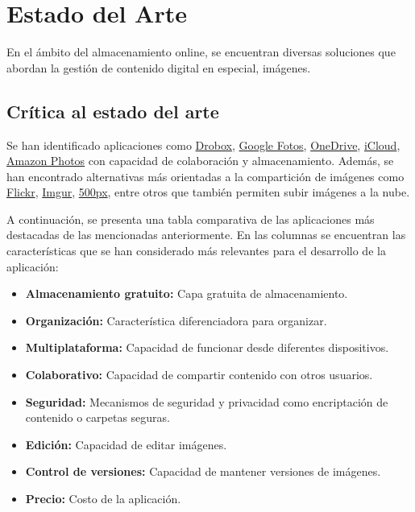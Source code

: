 \chapter{Estado del Arte}

En el ámbito del almacenamiento online, se encuentran diversas soluciones
que abordan la gestión de contenido digital en especial, imágenes.

\section{Crítica al estado del arte}

Se han identificado aplicaciones como \href{https://www.dropbox.com/es_ES/}{Drobox}, \href{https://www.google.com/intl/es/photos/about/}{Google Fotos}, \href{https://www.microsoft.com/es-es/microsoft-365/onedrive/online-cloud-storage}{OneDrive}, \href{https://www.icloud.com/}{iCloud}, \href{https://www.amazon.es/b?ie=UTF8&node=12364776031}{Amazon Photos} con capacidad de colaboración y almacenamiento.
Además, se han encontrado alternativas más orientadas a la compartición de imágenes como \href{https://www.flickr.com/}{Flickr}, \href{https://imgur.com/}{Imgur}, \href{https://500px.com/?lang=es}{500px}, entre otros que también permiten subir imágenes a la nube.

A continuación, se presenta una tabla comparativa de las aplicaciones más destacadas de las mencionadas anteriormente. En las columnas se encuentran las características que se han considerado más relevantes para el desarrollo de la aplicación:

\begin{itemize}
    \item \textbf{Almacenamiento gratuito:} Capa gratuita de almacenamiento.
    \item \textbf{Organización:} Característica diferenciadora para organizar.
    \item \textbf{Multiplataforma:} Capacidad de funcionar desde diferentes dispositivos.
    \item \textbf{Colaborativo:} Capacidad de compartir contenido con otros usuarios.
    \item \textbf{Seguridad:} Mecanismos de seguridad y privacidad como encriptación de contenido o carpetas seguras.
    \item \textbf{Edición:} Capacidad de editar imágenes.
    \item \textbf{Control de versiones:} Capacidad de mantener versiones de imágenes.
    \item \textbf{Precio:} Costo de la aplicación.
\end{itemize}

